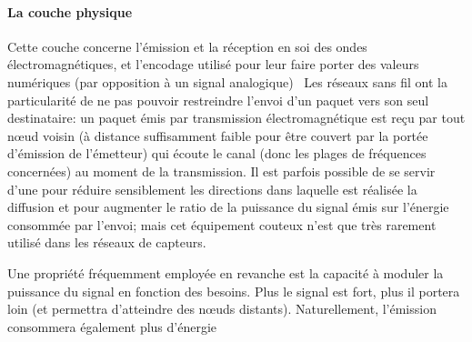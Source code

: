             \paragraph{La couche physique}
Cette couche concerne l'émission et la réception en soi des ondes électromagnétiques, et l'encodage utilisé pour leur faire porter des valeurs numériques (par opposition à un signal analogique)~\cite{TW10}
Les réseaux sans fil ont la particularité de ne pas pouvoir restreindre l'envoi d'un paquet vers son seul destinataire: un paquet émis par transmission électromagnétique est reçu par tout nœud voisin (\cad à distance suffisamment faible pour être couvert par la portée d'émission de l'émetteur) qui écoute le canal (donc les plages de fréquences concernées) au moment de la transmission.
Il est parfois possible de se servir d'une  pour réduire sensiblement les directions dans laquelle est réalisée la diffusion et pour augmenter le ratio de la puissance du signal émis sur l'énergie consommée par l'envoi; mais cet équipement couteux n'est que très rarement utilisé dans les réseaux de capteurs.

Une propriété fréquemment employée en revanche est la capacité à moduler la puissance du signal en fonction des besoins.
Plus le signal est fort, plus il portera loin (et permettra d'atteindre des nœuds distants).
Naturellement, l'émission consommera également plus d'énergie

